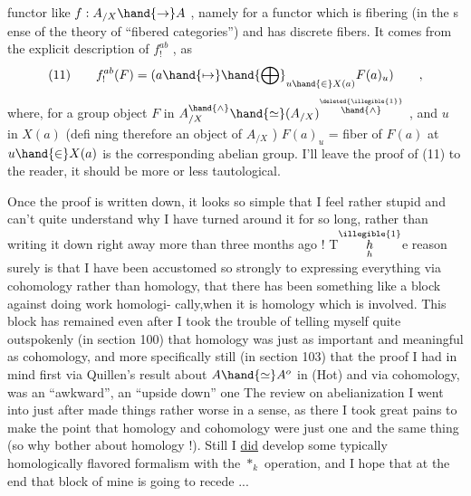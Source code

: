 
functor like $f : A_{/X} \hand{\to} A$ , namely for a functor which is fibering
(in the s ense of  the theory of ``fibered categories'') and has
discrete fibers. It comes from the explicit description of $f^{ab}_{!}$ ,
as
\[ (11) \qquad f^{ab}_{!}(F) = ( a \hand{\mapsto} \hand{\bigoplus}_{u\hand{\in} X(a)} F(a)_u ) \qquad , \]
where, for a group object $F$ in $A^{\hand{\wedge}}_{/X} \hand{\simeq} (A_{/X})^{\overset{\deleted{\illegible{1}}}{\hand{\wedge}}}$ , and $u$ in $X(a)$ (defi%
ning therefore an object of $A_{/X}$ ) $F(a)_u$ = fiber of $F(a)$ at $u \hand{\in} X(a)$\hand{,}
is the corresponding abelian group. I'll leave the proof of (11) to
the reader, it should be more or less tautological.

Once the  proof is written down, it looks so simple that I feel
rather stupid and can't quite understand why I have turned around it
for so long, rather than writing it down right away more than three
months ago ! T$\overset{\illegible{1}}{\underset{h}{h}}$e reason surely is that I have been accustomed so
strongly to expressing everything via cohomology rather than homology,
that there has been something like a block against doing work homologi-%
cally,when it is homology which is involved. This block has remained
even after I took the trouble of telling myself quite outspokenly
(in section 100) that homology was just as important and meaningful
as cohomology, and more specifically still (in section 103) that the
proof I had in mind first\hand{,} via Quillen's result about $A \hand{\simeq} A^{o}$ in (Hot)
and via cohomology, was an ``awkward'', an ``upside down'' one The
review on abelianization I went into just after made things rather
worse in a sense, as  there I took great pains to make
the point that homology and cohomology were just one and the same thing
(so why bother about homology !). Still I \uline{did} develop some typically
homologically flavored formalism with the $*_k$ operation, and I hope
that at the end that block of mine is going to recede  ...


